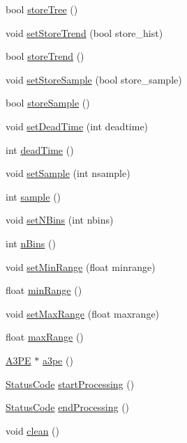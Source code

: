 \begin{DoxyCompactItemize}
\item 
bool \hyperlink{classAcquisition_a8ab7e58ccb3fee54eb6850e5081fae10}{storeTree} ()
\item 
void \hyperlink{classAcquisition_a1ceff272a1ad030dcd20c0dcddc65443}{setStoreTrend} (bool store\_\-hist)
\item 
bool \hyperlink{classAcquisition_a5af693448daef6e9e054ab7f1aa50784}{storeTrend} ()
\item 
void \hyperlink{classAcquisition_af36a1b660244096b7d274f591f67b695}{setStoreSample} (bool store\_\-sample)
\item 
bool \hyperlink{classAcquisition_a9af304e0fb2076cd4f92703708efe83e}{storeSample} ()
\item 
void \hyperlink{classAcquisition_a37e05315fc47958c290a7d938c61e067}{setDeadTime} (int deadtime)
\item 
int \hyperlink{classAcquisition_a8fb2cd60a34993ab0952d719a8517831}{deadTime} ()
\item 
void \hyperlink{classAcquisition_ade6fd6483b3e3737fe7dcdffb5065954}{setSample} (int nsample)
\item 
int \hyperlink{classAcquisition_a83181975c0746e5837d53933031e7b62}{sample} ()
\item 
void \hyperlink{classAcquisition_a6ee040a009aa48f848b1e12434135db9}{setNBins} (int nbins)
\item 
int \hyperlink{classAcquisition_a3a3dad0de9535d5a29c0810a5bdc3ae3}{nBins} ()
\item 
void \hyperlink{classAcquisition_a8a15ffc6e539a3ae12efe4bea1ca7587}{setMinRange} (float minrange)
\item 
float \hyperlink{classAcquisition_a44f441710231748d2ca8f691647b2bcd}{minRange} ()
\item 
void \hyperlink{classAcquisition_a786da6cff5428020034be23e554e0e1b}{setMaxRange} (float maxrange)
\item 
float \hyperlink{classAcquisition_a386f3ebc6b1d4956aa7e40b314ddb4eb}{maxRange} ()
\item 
\hyperlink{classA3PE}{A3PE} $\ast$ \hyperlink{classAcquisition_a8af496b6202d2509814e3b02197a5e73}{a3pe} ()
\item 
\hyperlink{classStatusCode}{StatusCode} \hyperlink{classProcessus_a09319bde9bed93e290f69b4e04585543}{startProcessing} ()
\item 
\hyperlink{classStatusCode}{StatusCode} \hyperlink{classProcessus_a5e4da662989d356b89d490b89c7afbfd}{endProcessing} ()
\item 
void \hyperlink{classProcessus_aaeb17673b98d2b39f3aa780e335e0968}{clean} ()

\end{DoxyCompactItemize}
